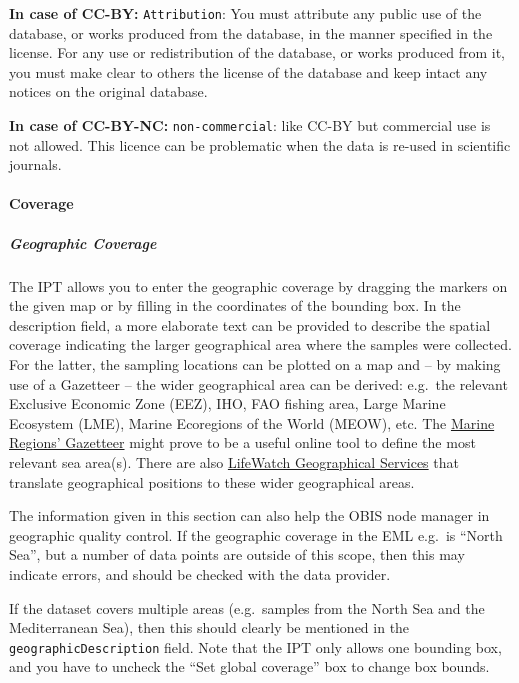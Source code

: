 \documentclass[
  letterpaper,
  DIV=11,
  numbers=noendperiod,
  oneside]{scrreprt}
\let\oldparagraph\paragraph
\renewcommand{\paragraph}[1]{\oldparagraph{#1}\mbox{}}
\let\oldsubparagraph\subparagraph
\renewcommand{\subparagraph}[1]{\oldsubparagraph{#1}\mbox{}}
\begin{document}
\textbf{In case of CC-BY:} \texttt{Attribution}: You must attribute any
public use of the database, or works produced from the database, in the
manner specified in the license. For any use or redistribution of the
database, or works produced from it, you must make clear to others the
license of the database and keep intact any notices on the original
database.

\textbf{In case of CC-BY-NC:} \texttt{non-commercial}: like CC-BY but
commercial use is not allowed. This licence can be problematic when the
data is re-used in scientific journals.

\hypertarget{coverage}{%
\paragraph{Coverage}\label{coverage}}

\hypertarget{geographic-coverage}{%
\subparagraph{Geographic Coverage}\label{geographic-coverage}}

The IPT allows you to enter the geographic coverage by dragging the
markers on the given map or by filling in the coordinates of the
bounding box. In the description field, a more elaborate text can be
provided to describe the spatial coverage indicating the larger
geographical area where the samples were collected. For the latter, the
sampling locations can be plotted on a map and -- by making use of a
Gazetteer -- the wider geographical area can be derived: e.g.~the
relevant Exclusive Economic Zone (EEZ), IHO, FAO fishing area, Large
Marine Ecosystem (LME), Marine Ecoregions of the World (MEOW), etc. The
\href{http://www.marineregions.org/}{Marine Regions' Gazetteer} might
prove to be a useful online tool to define the most relevant sea
area(s). There are also
\href{http://www.lifewatch.be/data-services/}{LifeWatch Geographical
Services} that translate geographical positions to these wider
geographical areas.

The information given in this section can also help the OBIS node
manager in geographic quality control. If the geographic coverage in the
EML e.g.~is ``North Sea'', but a number of data points are outside of
this scope, then this may indicate errors, and should be checked with
the data provider.

If the dataset covers multiple areas (e.g.~samples from the North Sea
and the Mediterranean Sea), then this should clearly be mentioned in the
\texttt{geographicDescription} field. Note that the IPT only allows one
bounding box, and you have to uncheck the ``Set global coverage'' box to
change box bounds.
\end{document}
